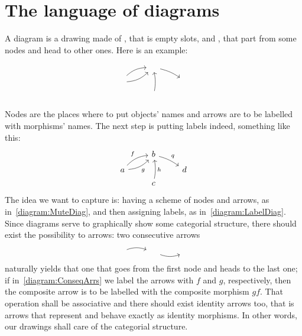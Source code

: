 
\section{The language of diagrams}

A diagram is a drawing made of , that is empty slots, and
, that part from some nodes and head to other ones. Here is
an example:
\begin{equation}\begin{tikzcd}[row sep=tiny]
    & \phantom\square \ar[dr, bend left=10] \\
    \phantom\square \ar[ur, bend left=20] \ar[ur, bend right=20, swap] & & \phantom\square  \\
    & \phantom\square \ar[uu, bend right=10, swap]
  \end{tikzcd}\label{diagram:MuteDiag}\end{equation}
%
Nodes are the places where to put objects' names and arrows are to be
labelled with morphisms' names. The next step is putting labels
indeed, something like this:
\begin{equation}\begin{tikzcd}[row sep=tiny]
    & b \ar["q", dr, bend left=10] \\
    a \arrow["f", ur, bend left=20] \arrow["g", ur, bend right=20, swap] & & d  \\
    & c \arrow["h", uu, bend right=10, swap]
  \end{tikzcd}\label{diagram:LabelDiag}\end{equation}
%
The idea we want to capture is: having a scheme of nodes and arrows,
as in~\eqref{diagram:MuteDiag}, and then assigning labels, as
in~\eqref{diagram:LabelDiag}. Since diagrams serve to graphically show
some categorial structure, there should exist the possibility to
 arrows: two consecutive arrows
\begin{equation}\begin{tikzcd}
    \phantom\square \ar[r, bend left=20] & \phantom\square \ar[r, swap, bend
    right=20] & \phantom\square
  \end{tikzcd}\label{diagram:ConseqArrs}\end{equation}
naturally yields that one that goes from the first node and heads to
the last one; if in~\eqref{diagram:ConseqArrs} we label the arrows
with \(f\) and \(g\), respectively, then the composite arrow is to be
labelled with the composite morphism \(gf\). That operation shall be
associative and there should exist identity arrows too, that is arrows
that represent and behave exactly as identity morphisms. In other
words, our drawings shall care of the categorial structure.

